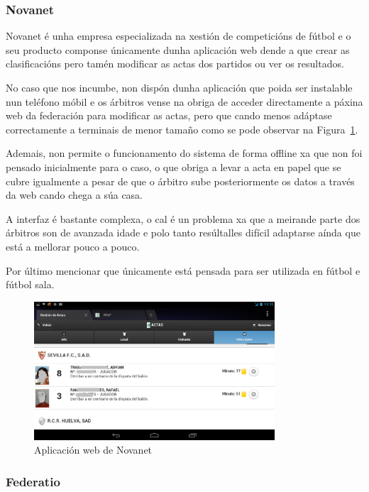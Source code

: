       \subsubsection{Novanet}
      Novanet é unha empresa especializada na xestión de competicións de fútbol 
e o seu producto componse únicamente dunha aplicación web dende a que crear as 
clasificacións pero tamén modificar as actas dos partidos ou ver os resultados.

      No caso que nos incumbe, non dispón dunha aplicación que poida ser instalable nun 
teléfono móbil e os árbitros vense na obriga de acceder directamente a páxina web da 
federación para modificar as actas, pero que cando menos adáptase correctamente 
a terminais de menor tamaño como se pode observar na 
Figura~\ref{fig:img:novanet}.

      Ademais, non permite o funcionamento do sistema de forma offline xa que 
non foi pensado inicialmente para o caso, o que obriga a levar a acta en papel 
que se cubre igualmente a pesar de que o árbitro sube posteriormente os datos a 
través da web cando chega a súa casa.

      A interfaz é bastante complexa, o cal é un problema xa que a meirande parte dos 
árbitros son de avanzada idade e polo tanto resúltalles difícil adaptarse 
aínda que está a mellorar pouco a pouco.

      Por último mencionar que únicamente está pensada para ser utilizada en 
fútbol e fútbol sala.
	
      \begin{figure}[h!]
	\begin{center}
	  \includegraphics[width=0.8\textwidth]{./img/novanet-app.png}
	  \caption{Aplicación web de Novanet}
	  \label{fig:img:novanet}
	\end{center}
      \end{figure}

    \subsubsection{Federatio}

